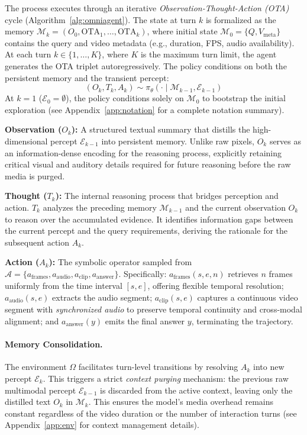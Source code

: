 \documentclass{article}
\theoremstyle{plain}
\theoremstyle{definition}
\theoremstyle{remark}
\begin{document}
The process executes through an iterative \textit{Observation-Thought-Action (OTA)} cycle (Algorithm~\ref{alg:omniagent}). The state at turn $k$ is formalized as the memory $\mathcal{M}_k = (O_0, \text{OTA}_1, \dots, \text{OTA}_k)$, where initial state $\mathcal{M}_0 = \{Q, V_{\text{meta}}\}$ contains the query and video metadata (e.g., duration, FPS, audio availability). At each turn $k \in \{1, \dots, K\}$, where $K$ is the maximum turn limit, the agent generates the OTA triplet autoregressively. The policy conditions on both the persistent memory and the transient percept:
\begin{equation}
    (O_k, T_k, A_k) \sim \pi_\theta(\cdot \mid \mathcal{M}_{k-1}, \mathcal{E}_{k-1})
\end{equation}
At $k=1$ ($\mathcal{E}_0=\emptyset$), the policy conditions solely on $\mathcal{M}_0$ to bootstrap the initial exploration (see Appendix~\ref{app:notation} for a complete notation summary).

\textbf{Observation ($O_k$):} A structured textual summary that distills the high-dimensional percept $\mathcal{E}_{k-1}$ into persistent memory. Unlike raw pixels, $O_k$ serves as an information-dense encoding for the reasoning process, explicitly retaining critical visual and auditory details required for future reasoning before the raw media is purged.

\textbf{Thought ($T_k$):} The internal reasoning process that bridges perception and action.
$T_k$ analyzes the preceding memory $\mathcal{M}_{k-1}$ and the current
observation $O_k$ to reason over the accumulated evidence. It identifies
information gaps between the current percept and the query requirements,
deriving the rationale for the subsequent action $A_k$.      

\textbf{Action ($A_k$):} The symbolic operator sampled from $\mathcal{A} = \{a_{\text{frames}}, a_{\text{audio}}, a_{\text{clip}}, a_{\text{answer}}\}$. Specifically: $a_{\text{frames}}(s, e, n)$ retrieves $n$ frames uniformly from the time interval $[s, e]$, offering flexible temporal resolution; $a_{\text{audio}}(s, e)$ extracts the audio segment; $a_{\text{clip}}(s, e)$ captures a continuous video segment with \textit{synchronized audio} to preserve temporal continuity and cross-modal alignment; and $a_{\text{answer}}(y)$ emits the final answer $y$, terminating the trajectory.

\paragraph{Memory Consolidation.} 
The environment $\Omega$ facilitates turn-level transitions by resolving $A_k$ into new percept $\mathcal{E}_k$. This triggers a strict \textit{context purging} mechanism: the previous raw multimodal percept $\mathcal{E}_{k-1}$ is discarded from the active context, leaving only the distilled text $O_k$ in $\mathcal{M}_k$. This ensures the model's media overhead remains constant regardless of the video duration or the number of interaction turns (see Appendix~\ref{app:env} for context management details).
\end{document}
